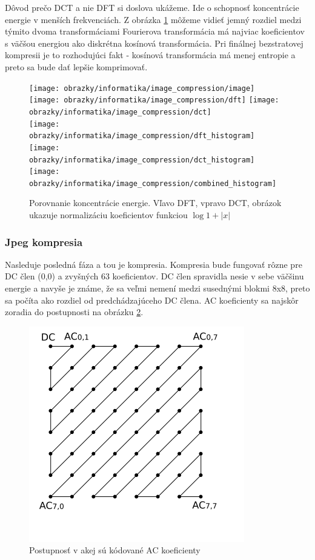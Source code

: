  Dôvod  prečo DCT a nie DFT si doslova ukážeme.
 Ide o schopnosť koncentrácie energie
 v menších frekvenciách. Z obrázka \ref{fig:dct_vs_dft}
 môžeme vidieť jemný rozdiel medzi týmito dvoma transformáciami
 Fourierova transformácia má najviac koeficientov s väčšou energiou
 ako diskrétna kosínová transformácia. Pri finálnej
 bezstratovej kompresii je to rozhodujúci fakt - kosínová
 transformácia má menej entropie a preto sa bude dať lepšie
 komprimovať.
\begin{figure}[htp]
    \centering
    \texttt{[image: obrazky/informatika/image\_compression/image]} \\
    \texttt{[image: obrazky/informatika/image\_compression/dft]}
    \texttt{[image: obrazky/informatika/image\_compression/dct]} \\
    \texttt{[image: obrazky/informatika/image\_compression/dft\_histogram]}
    \texttt{[image: obrazky/informatika/image\_compression/dct\_histogram]}
    \texttt{[image: obrazky/informatika/image\_compression/combined\_histogram]}
    \caption{Porovnanie koncentrácie energie. Vľavo DFT, vpravo DCT,
    obrázok ukazuje normalizáciu koeficientov funkciou $\log 1+|x|$}
    \label{fig:dct_vs_dft}
\end{figure}


\subsubsection{Jpeg kompresia }
Nasleduje posledná fáza a tou je kompresia. Kompresia bude fungovať
rôzne pre DC člen (0,0) a zvyšných 63 koeficientov. DC člen spravidla nesie v
sebe väčšinu energie a navyše je známe, že sa veľmi nemení medzi
susednými blokmi 8x8, preto sa počíta ako rozdiel od predchádzajúceho
DC člena. AC koeficienty sa najskôr zoradia do 
postupnosti na obrázku \ref{fig:jpeg_zig_zag}. 

\begin{figure}[htp]
    \centering
    \includegraphics{obrazky/informatika/image_compression/zig_zag}
    \caption{Postupnosť v akej sú kódované AC koeficienty}
    \label{fig:jpeg_zig_zag}
\end{figure}

